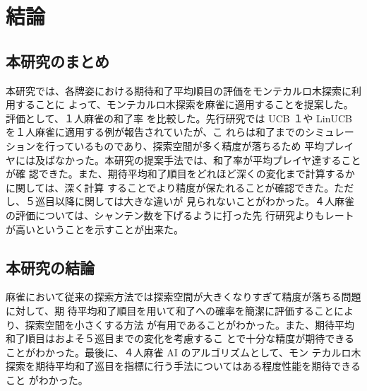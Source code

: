 \chapter{結論}
\label{chap:conclusion}
\section{本研究のまとめ}
本研究では、各牌姿における期待和了平均順目の評価をモンテカルロ木探索に利用することに
よって、モンテカルロ木探索を麻雀に適用することを提案した。評価として、１人麻雀の和了率
を比較した。先行研究では UCB １や LinUCB を１人麻雀に適用する例が報告されていたが、こ
れらは和了までのシミュレーションを行っているものであり、探索空間が多く精度が落ちるため
平均プレイヤには及ばなかった。本研究の提案手法では、和了率が平均プレイヤ達することが確
認できた。また、期待平均和了順目をどれほど深くの変化まで計算するかに関しては、深く計算
することでより精度が保たれることが確認できた。ただし、５巡目以降に関しては大きな違いが
見られないことがわかった。４人麻雀の評価については、シャンテン数を下げるように打った先
行研究よりもレートが高いということを示すことが出来た。

\section{本研究の結論}
麻雀において従来の探索方法では探索空間が大きくなりすぎて精度が落ちる問題に対して、期
待平均和了順目を用いて和了への確率を簡潔に評価することにより、探索空間を小さくする方法
が有用であることがわかった。また、期待平均和了順目はおよそ５巡目までの変化を考慮するこ
とで十分な精度が期待できることがわかった。最後に、４人麻雀 AI のアルゴリズムとして、モン
テカルロ木探索を期待平均和了巡目を指標に行う手法についてはある程度性能を期待できること
がわかった。
